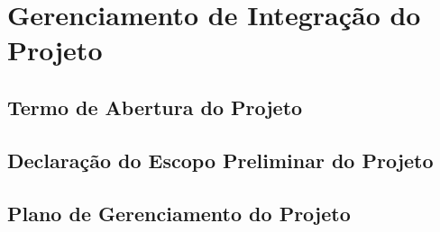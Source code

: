 


\chapter{Gerenciamento de Integração do Projeto}



    \section{Termo de Abertura do Projeto}

    

    \section{Declaração do Escopo Preliminar do Projeto}



    \section{Plano de Gerenciamento do Projeto}



